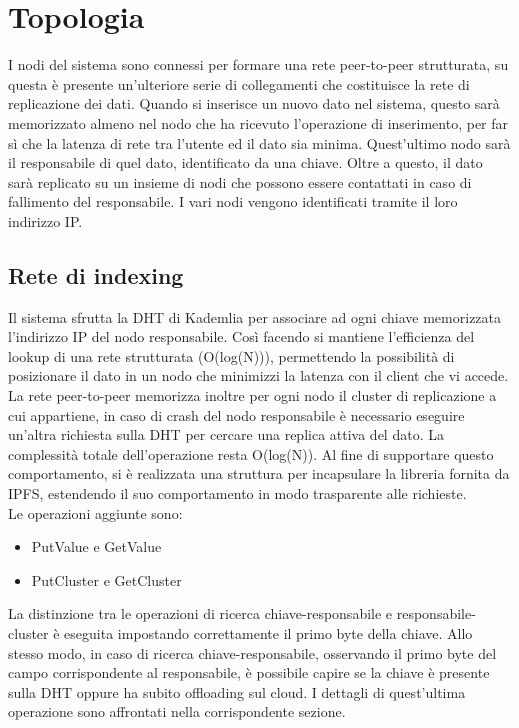 \documentclass[conference]{IEEEtran}
\begin{document}
\section{Topologia}
I nodi del sistema sono connessi per formare una rete peer-to-peer strutturata, su questa è presente un'ulteriore serie di collegamenti
che costituisce la rete di replicazione dei dati. Quando si inserisce un nuovo dato nel sistema, questo sarà memorizzato
almeno nel nodo che ha ricevuto l'operazione di inserimento, per far sì che la latenza di rete tra l'utente ed il dato sia minima.
Quest'ultimo nodo sarà il responsabile di quel dato, identificato da una chiave. Oltre a questo, il dato sarà replicato
su un insieme di nodi che possono essere contattati in caso di fallimento del responsabile.
I vari nodi vengono identificati tramite il loro indirizzo IP.
\subsection{Rete di indexing}
Il sistema sfrutta la DHT di Kademlia per associare ad ogni chiave memorizzata l'indirizzo IP del nodo responsabile.
Così facendo si mantiene l'efficienza del lookup di una rete strutturata (O(log(N))), permettendo la possibilità di posizionare
il dato in un nodo che minimizzi la latenza con il client che vi accede. La rete peer-to-peer memorizza inoltre per ogni
nodo il cluster di replicazione a cui appartiene, in caso di crash del nodo responsabile è necessario eseguire un'altra richiesta sulla
DHT per cercare una replica attiva del dato. La complessità totale dell'operazione resta O(log(N)).
Al fine di supportare questo comportamento, si è realizzata una struttura per incapsulare la libreria fornita da IPFS,
estendendo il suo comportamento in modo trasparente alle richieste.\\
Le operazioni aggiunte sono:
\begin{itemize}
  \item {PutValue e GetValue}
  \item {PutCluster e GetCluster}
\end{itemize}
La distinzione tra le operazioni di ricerca chiave-responsabile e responsabile-cluster è eseguita impostando correttamente
il primo byte della chiave.
Allo stesso modo, in caso di ricerca chiave-responsabile, osservando il primo byte del campo corrispondente al responsabile,
è possibile capire se la chiave è presente sulla DHT oppure ha subito offloading sul cloud. I dettagli di quest'ultima
operazione sono affrontati nella corrispondente sezione.
\end{document}

